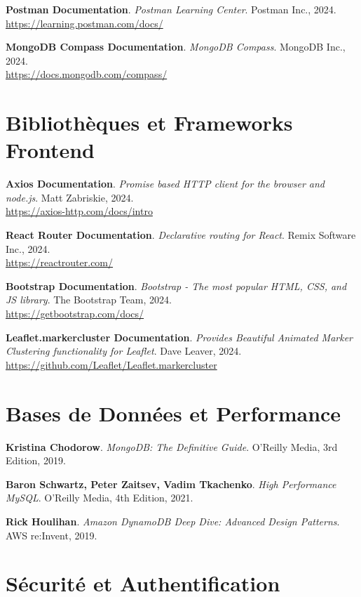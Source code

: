 \noindent [19] \textbf{Postman Documentation}. \textit{Postman Learning Center}. Postman Inc., 2024. \\
\url{https://learning.postman.com/docs/}

\noindent [20] \textbf{MongoDB Compass Documentation}. \textit{MongoDB Compass}. MongoDB Inc., 2024. \\
\url{https://docs.mongodb.com/compass/}

\section*{Bibliothèques et Frameworks Frontend}

\noindent [21] \textbf{Axios Documentation}. \textit{Promise based HTTP client for the browser and node.js}. Matt Zabriskie, 2024. \\
\url{https://axios-http.com/docs/intro}

\noindent [22] \textbf{React Router Documentation}. \textit{Declarative routing for React}. Remix Software Inc., 2024. \\
\url{https://reactrouter.com/}

\noindent [23] \textbf{Bootstrap Documentation}. \textit{Bootstrap - The most popular HTML, CSS, and JS library}. The Bootstrap Team, 2024. \\
\url{https://getbootstrap.com/docs/}

\noindent [24] \textbf{Leaflet.markercluster Documentation}. \textit{Provides Beautiful Animated Marker Clustering functionality for Leaflet}. Dave Leaver, 2024. \\
\url{https://github.com/Leaflet/Leaflet.markercluster}

\section*{Bases de Données et Performance}

\noindent [29] \textbf{Kristina Chodorow}. \textit{MongoDB: The Definitive Guide}. O'Reilly Media, 3rd Edition, 2019.

\noindent [30] \textbf{Baron Schwartz, Peter Zaitsev, Vadim Tkachenko}. \textit{High Performance MySQL}. O'Reilly Media, 4th Edition, 2021.

\noindent [31] \textbf{Rick Houlihan}. \textit{Amazon DynamoDB Deep Dive: Advanced Design Patterns}. AWS re:Invent, 2019.

\section*{Sécurité et Authentification}

